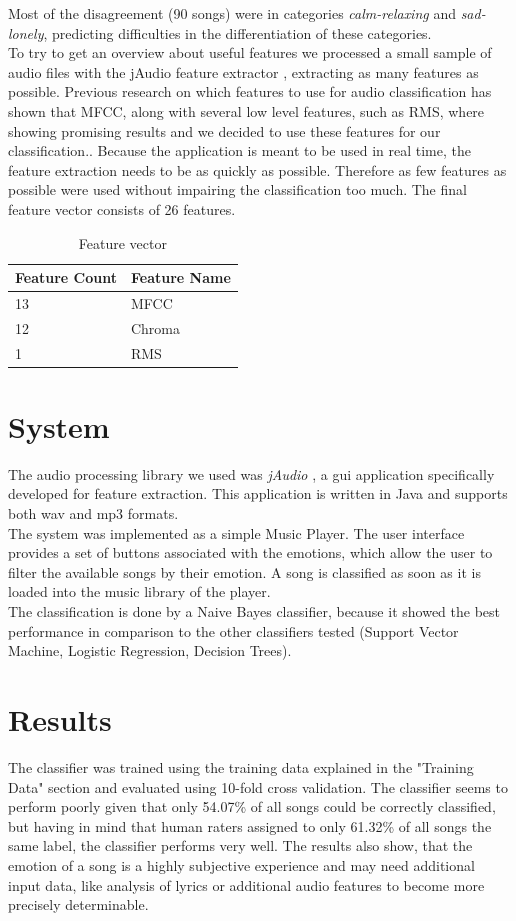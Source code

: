 \documentclass{sigchi-ext}
\begin{document}
Most of the disagreement (90 songs) were in categories \textit{calm-relaxing} and \textit{sad-lonely}, predicting difficulties in the differentiation of these categories.\\

To try to get an overview about useful features we processed a small sample of audio files with the jAudio feature extractor \cite{McEnnis2005}, extracting as many features as possible. 
Previous research on which features to use for audio classification has shown that MFCC, along with several low level features, such as RMS, where showing promising results and we decided to use these features for our classification.\cite{Mckinney2003, Mandel2005, Tzanetakis2001}.  Because the application is meant to be used in real time, the feature extraction needs to be as quickly as possible. Therefore as few features as possible were used without impairing the classification too much. The final feature vector consists of 26 features.

\begin{table}
  \centering
  \begin{tabular}{@{}ll@{}}
    Feature Count & Feature Name \\ \midrule
    13 & MFCC \\
    12 & Chroma \\
    1  & RMS
  \end{tabular}
  \caption{Feature vector}
  \label{feature-vector}
\end{table}

\section{System}
The audio processing library we used was \textit{jAudio} \cite{McEnnis2005}, a gui application specifically developed for feature extraction. This application is written in Java and supports both wav and mp3 formats.\\
The system was implemented as a simple Music Player. The user interface provides a set of buttons associated with the emotions, which allow the user to filter the available songs by their emotion. A song is classified as soon as it is loaded into the music library of the player.\\
The classification is done by a Naive Bayes classifier, because it showed the best performance in comparison to the other classifiers tested (Support Vector Machine, Logistic Regression, Decision Trees).

\section{Results}
The classifier was trained using the training data explained in the "Training Data" section and evaluated using 10-fold cross validation. The classifier seems to perform poorly given that only 54.07\% of all songs could be correctly classified, but having in mind that human raters assigned to only 61.32\% of all songs the same label, the classifier performs very well. The results also show, that the emotion of a song is a highly subjective experience and may need additional input data, like analysis of lyrics or additional audio features to become more precisely determinable.
\end{document}

